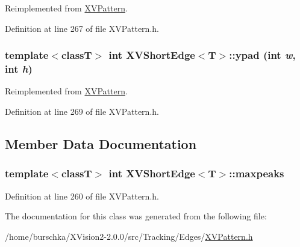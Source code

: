 Reimplemented from \hyperlink{class_XVPattern}{XVPattern}.

Definition at line 267 of file XVPattern.h.\label{XVShortEdge_a3}
\hypertarget{class_XVShortEdge_a3}{
\subsubsection[ypad]{\setlength{\rightskip}{0pt plus 5cm}template$<$classT$>$ int XVShort\-Edge$<$T$>$::ypad (int {\em w}, int {\em h})}}




Reimplemented from \hyperlink{class_XVPattern}{XVPattern}.

Definition at line 269 of file XVPattern.h.

\subsection{Member Data Documentation}
\label{XVShortEdge_o0}
\hypertarget{class_XVShortEdge_o0}{
\subsubsection[maxpeaks]{\setlength{\rightskip}{0pt plus 5cm}template$<$classT$>$ int XVShort\-Edge$<$T$>$::maxpeaks}}




Definition at line 260 of file XVPattern.h.

The documentation for this class was generated from the following file:\begin{CompactItemize}
\item 
/home/burschka/XVision2-2.0.0/src/Tracking/Edges/\hyperlink{XVPattern.h-source}{XVPattern.h}\end{CompactItemize}
